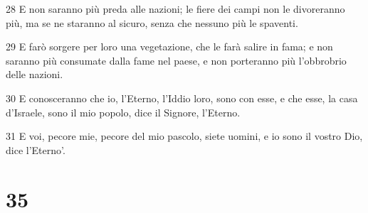 \par 28 E non saranno più preda alle nazioni; le fiere dei campi non le divoreranno più, ma se ne staranno al sicuro, senza che nessuno più le spaventi.
\par 29 E farò sorgere per loro una vegetazione, che le farà salire in fama; e non saranno più consumate dalla fame nel paese, e non porteranno più l'obbrobrio delle nazioni.
\par 30 E conosceranno che io, l'Eterno, l'Iddio loro, sono con esse, e che esse, la casa d'Israele, sono il mio popolo, dice il Signore, l'Eterno.
\par 31 E voi, pecore mie, pecore del mio pascolo, siete uomini, e io sono il vostro Dio, dice l'Eterno'.

\chapter{35}

